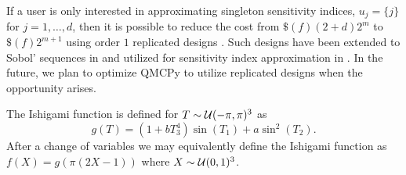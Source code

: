 \documentclass{article}[12pt]
\begin{document}
If a user is only interested in approximating singleton sensitivity indices, $u_j = \{j\}$ for $j=1,\dots,d$, then it is possible to reduce the cost from $\$(f)(2+d)2^m$ to $\$(f)2^{m+1}$ using order $1$ replicated designs \cite{alex2008comparison,tissot2015randomized}. Such designs have been extended to  Sobol' sequences  in \cite{replicated_designs_sobol_seq} and utilized for sensitivity index approximation in \cite{reliable_sobol_indices_approx}. In the future, we plan to optimize QMCPy to utilize replicated designs when the opportunity arises.


The Ishigami function \cite{ishigami1990importance} is defined for $T \sim \mathcal{U}(-\pi,\pi)^3$ as
\begin{equation*}
    g(T) = \left(1+bT_3^4\right)\sin(T_1) + a\sin^2(T_2).
\end{equation*}
After a change of variables we may equivalently define the Ishigami function as 
$f(X) = g\left(\pi(2X-1)\right)$ where $X \sim \mathcal{U}(0,1)^3$. 




\printbibliography
\end{document}
